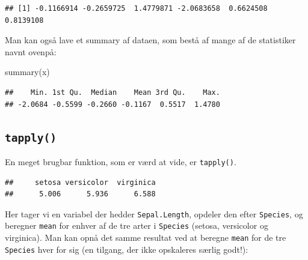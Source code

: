 \documentclass[
]{book}
\newenvironment{Shaded}{\begin{snugshade}}{\end{snugshade}}
\newcommand{\CommentTok}[1]{\textcolor[rgb]{0.56,0.35,0.01}{\textit{#1}}}
\newcommand{\FunctionTok}[1]{\textcolor[rgb]{0.00,0.00,0.00}{#1}}
\newcommand{\NormalTok}[1]{#1}
\newcommand{\SpecialCharTok}[1]{\textcolor[rgb]{0.00,0.00,0.00}{#1}}
\begin{document}
\begin{verbatim}
## [1] -0.1166914 -0.2659725  1.4779871 -2.0683658  0.6624508  0.8139108
\end{verbatim}

Man kan også lave et summary af dataen, som bestå af mange af de statistiker navnt ovenpå:

\begin{Shaded}
\begin{Highlighting}[]
\FunctionTok{summary}\NormalTok{(x)}
\end{Highlighting}
\end{Shaded}

\begin{verbatim}
##    Min. 1st Qu.  Median    Mean 3rd Qu.    Max. 
## -2.0684 -0.5599 -0.2660 -0.1167  0.5517  1.4780
\end{verbatim}

\hypertarget{tapply}{%
\subsection{\texorpdfstring{\texttt{tapply()}}{tapply()}}\label{tapply}}

En meget brugbar funktion, som er værd at vide, er \texttt{tapply()}.

\begin{Shaded}
\end{Shaded}

\begin{verbatim}
##     setosa versicolor  virginica 
##      5.006      5.936      6.588
\end{verbatim}

Her tager vi en variabel der hedder \texttt{Sepal.Length}, opdeler den efter \texttt{Species}, og beregner \texttt{mean} for enhver af de tre arter i \texttt{Species} (setosa, versicolor og virginica). Man kan opnå det samme resultat ved at beregne \texttt{mean} for de tre \texttt{Species} hver for sig (en tilgang, der ikke opskaleres særlig godt!):
\end{document}
